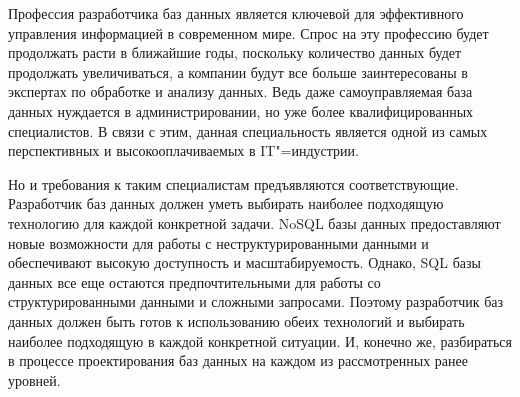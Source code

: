 Профессия разработчика баз данных является ключевой для эффективного управления информацией в современном мире. Спрос 
на эту профессию будет продолжать расти в ближайшие годы, поскольку количество данных будет продолжать увеличиваться, а 
компании будут все больше заинтересованы в экспертах по обработке и анализу данных. Ведь даже самоуправляемая база данных нуждается 
в администрировании, но уже более квалифицированных специалистов. В связи с этим, данная специальность является одной из самых перспективных и высокооплачиваемых в IT"=индустрии.

Но и требования к таким специалистам предъявляются соответствующие. Разработчик баз данных должен уметь выбирать наиболее
подходящую технологию для каждой конкретной задачи. NoSQL базы данных предоставляют новые возможности для работы с 
неструктурированными данными и обеспечивают высокую доступность и масштабируемость. Однако, SQL базы данных все еще остаются 
предпочтительными для работы со структурированными данными и сложными запросами. Поэтому разработчик баз данных должен быть 
готов к использованию обеих технологий и выбирать наиболее подходящую в каждой конкретной ситуации. И, конечно же, разбираться в процессе проектирования баз данных на каждом из рассмотренных ранее уровней.


